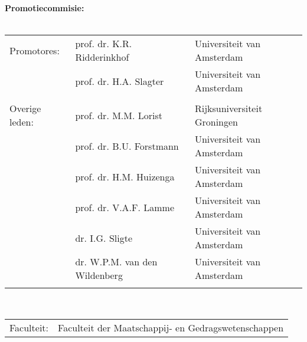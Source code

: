 {%
\clearpage
\noindent%
{\bf Promotiecommisie:}\\
\\
\begin{tabular}[t]{@{}p{2.25cm}ll}
Promotores:    & prof. dr. K.R. Ridderinkhof    & Universiteit van Amsterdam \\  %
               & prof. dr. H.A. Slagter         & Universiteit van Amsterdam \\  %
\\
Overige leden: & prof. dr. M.M. Lorist          & Rijksuniversiteit Groningen \\ %
               & prof. dr. B.U. Forstmann       & Universiteit van Amsterdam \\  %
               & prof. dr. H.M. Huizenga        & Universiteit van Amsterdam \\  %
               & prof. dr. V.A.F. Lamme         & Universiteit van Amsterdam \\  %
               & dr. I.G. Sligte                & Universiteit van Amsterdam \\  %
               & dr. W.P.M. van den Wildenberg  & Universiteit van Amsterdam \\  %
\\               
\end{tabular}\\

\noindent%
\begin{tabular}[t]{@{}p{2.25cm}l}
Faculteit:     & Faculteit der Maatschappij- en Gedragswetenschappen \\ %
\end{tabular}\\

\clearpage
} %